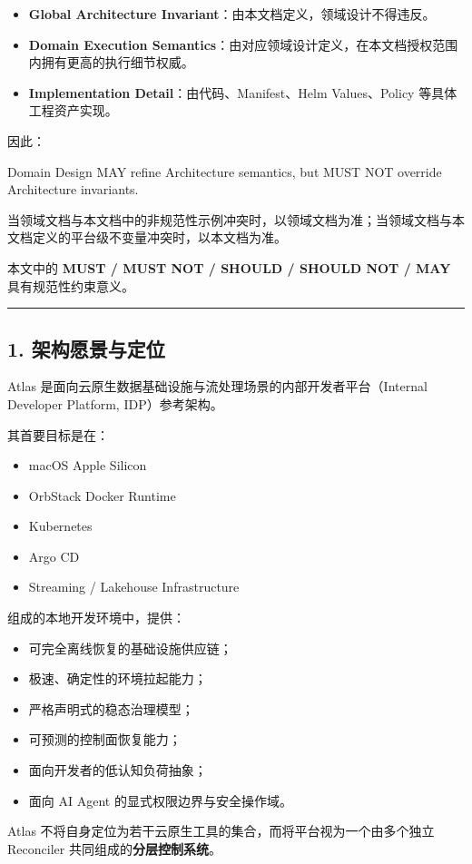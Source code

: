 \documentclass[11pt,a4paper]{article}
\begin{document}
\begin{itemize}
  \item \textbf{Global Architecture Invariant}：由本文档定义，领域设计不得违反。
  \item \textbf{Domain Execution Semantics}：由对应领域设计定义，在本文档授权范围内拥有更高的执行细节权威。
  \item \textbf{Implementation Detail}：由代码、Manifest、Helm Values、Policy 等具体工程资产实现。
\end{itemize}
因此：

\begin{gfmBlockquote}
Domain Design MAY refine Architecture semantics, but MUST NOT override Architecture invariants.
\end{gfmBlockquote}
当领域文档与本文档中的非规范性示例冲突时，以领域文档为准；当领域文档与本文档定义的平台级不变量冲突时，以本文档为准。

本文中的 \textbf{MUST / MUST NOT / SHOULD / SHOULD NOT / MAY} 具有规范性约束意义。

\vspace{0.5em}\hrule\vspace{0.5em}
\subsection{1. 架构愿景与定位}
Atlas 是面向云原生数据基础设施与流处理场景的内部开发者平台（Internal Developer Platform, IDP）参考架构。

其首要目标是在：

\begin{itemize}
  \item macOS Apple Silicon
  \item OrbStack Docker Runtime
  \item Kubernetes
  \item Argo CD
  \item Streaming / Lakehouse Infrastructure
\end{itemize}
组成的本地开发环境中，提供：

\begin{itemize}
  \item 可完全离线恢复的基础设施供应链；
  \item 极速、确定性的环境拉起能力；
  \item 严格声明式的稳态治理模型；
  \item 可预测的控制面恢复能力；
  \item 面向开发者的低认知负荷抽象；
  \item 面向 AI Agent 的显式权限边界与安全操作域。
\end{itemize}
Atlas 不将自身定位为若干云原生工具的集合，而将平台视为一个由多个独立 Reconciler 共同组成的\textbf{分层控制系统}。
\end{document}
